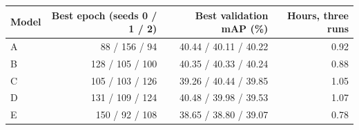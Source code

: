 \begin{tabular}{lrrr}
\hline
Model & Best epoch (seeds 0 / 1 / 2) & Best validation mAP (\%) & Hours, three runs \\
\hline
A & 88 / 156 / 94 & 40.44 / 40.11 / 40.22 & 0.92 \\
B & 128 / 105 / 100 & 40.35 / 40.33 / 40.24 & 0.88 \\
C & 105 / 103 / 126 & 39.26 / 40.44 / 39.85 & 1.05 \\
D & 131 / 109 / 124 & 40.48 / 39.98 / 39.53 & 1.07 \\
E & 150 / 92 / 108 & 38.65 / 38.80 / 39.07 & 0.78 \\
\hline
\end{tabular}
